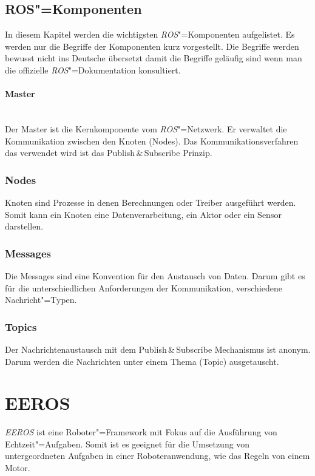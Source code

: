 \subsection{ROS"=Komponenten}
In diesem Kapitel werden die wichtigsten \textit{ROS}"=Komponenten aufgelistet.
Es werden nur die Begriffe der Komponenten kurz vorgestellt.
Die Begriffe werden bewusst nicht ins Deutsche übersetzt damit die Begriffe geläufig sind wenn man die offizielle \textit{ROS}"=Dokumentation konsultiert.

\paragraph*{Master} \mbox{}\\
Der Master ist die Kernkomponente vom \textit{ROS}"=Netzwerk.
Er verwaltet die Kommunikation zwischen den Knoten (Nodes).
Das Kommunikationsverfahren das verwendet wird ist das Publish\,\&\,Subscribe Prinzip. %

\subsubsection{Nodes}
Knoten sind Prozesse in denen Berechnungen oder Treiber ausgeführt werden. 
Somit kann ein Knoten eine Datenverarbeitung, ein Aktor oder ein Sensor darstellen.  

\subsubsection{Messages}
Die Messages sind eine Konvention für den Austausch von Daten.
Darum gibt es für die unterschiedlichen Anforderungen der Kommunikation, verschiedene Nachricht"=Typen.

\subsubsection{Topics}
Der Nachrichtenaustausch mit dem Publish\,\&\,Subscribe Mechanismus ist anonym.
Darum werden die Nachrichten unter einem Thema (Topic) ausgetauscht.

\section{EEROS}
\textit{EEROS} ist eine Roboter"=Framework mit Fokus auf die Ausführung von Echtzeit"=Aufgaben.
Somit ist es geeignet für die Umsetzung von untergeordneten Aufgaben in einer Roboteranwendung, wie das Regeln von einem Motor.
